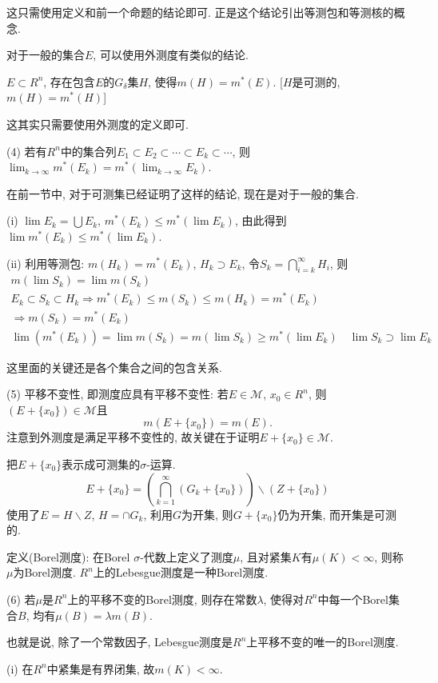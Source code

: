 \documentclass[12pt,a4paper,openany]{book}
\begin{document}
这只需使用定义和前一个命题的结论即可. 正是这个结论引出等测包和等测核的概念.

对于一般的集合$E$, 可以使用外测度有类似的结论.

$E \subset R^n$, 存在包含$E$的$G_{\delta}$集$H$, 使得$m(H) = m^*(E)$. [$H$是可测的, $m(H) = m^*(H)$]

这其实只需要使用外测度的定义即可.

(4) 若有$R^n$中的集合列$E_1 \subset E_2 \subset \cdots \subset E_k \subset \cdots$, 则$\lim_{k \rightarrow \infty}{m^*(E_k)} = m^*(\lim_{k \rightarrow \infty}{E_k})$.

在前一节中, 对于可测集已经证明了这样的结论, 现在是对于一般的集合.

(i) $\lim{E_k} = \bigcup{E_k}$, $m^*(E_k) \le m^*(\lim{E_k})$, 由此得到$\lim{m^*(E_k)} \le m^*(\lim{E_k})$.

(ii) 利用等测包: $m(H_k) = m^*(E_k)$, $H_k \supset E_k$, 令$S_k = \bigcap_{i=k}^{\infty}{H_i}$, 则
\begin{gather*}
m(\lim{S_k}) = \lim{m(S_k)} \\
E_k \subset S_k \subset H_k \Rightarrow m^*(E_k) \le m(S_k) \le m(H_k) = m^*(E_k) \\
\Rightarrow m(S_k) = m^*(E_k) \\
\lim{(m^*(E_k))} = \lim{m(S_k)} = m(\lim{S_k}) \ge m^*(\lim{E_k}) \quad \lim{S_k} \supset \lim{E_k}
\end{gather*}

这里面的关键还是各个集合之间的包含关系.

(5) 平移不变性, 即测度应具有平移不变性: 若$E \in \mathcal{M}$, $x_0 \in R^n$, 则$(E + \{x_0\}) \in \mathcal{M}$且
\[
m(E + \{x_0\}) = m(E).
\]
注意到外测度是满足平移不变性的, 故关键在于证明$E + \{x_0\} \in \mathcal{M}$.

把$E + \{x_0\}$表示成可测集的$\sigma$-运算.
\[
E + \{x_0\} = (\bigcap_{k=1}^{\infty}{(G_k + \{x_0\})}) \backslash (Z + \{x_0\})
\]
使用了$E = H \backslash Z$, $H = \cap{G_k}$, 利用$G$为开集, 则$G + \{x_0\}$仍为开集, 而开集是可测的.

定义(Borel测度): 在Borel $\sigma$-代数上定义了测度$\mu$, 且对紧集$K$有$\mu(K) < \infty$, 则称$\mu$为Borel测度. $R^n$上的Lebesgue测度是一种Borel测度.

(6) 若$\mu$是$R^n$上的平移不变的Borel测度, 则存在常数$\lambda$, 使得对$R^n$中每一个Borel集合$B$, 均有$\mu(B) = \lambda{m(B)}$.

也就是说, 除了一个常数因子, Lebesgue测度是$R^n$上平移不变的唯一的Borel测度.

(i) 在$R^n$中紧集是有界闭集, 故$m(K) < \infty$.
\end{document}
